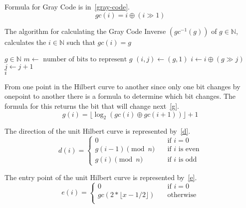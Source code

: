 \documentclass[10pt]{article}
\begin{document}
\flushleft
Formula for Gray Code is in~\ref{gray-code}.
\begin{equation}
  \label{gray-code}
  gc(i) = i \oplus \left( i \gg 1 \right) 
\end{equation}

\begin{algorithm}
  \caption{The algorithm for calculating the Gray Code Inverse $(gc^{-1}(g))$ of $g \in \mathbb{N}$, calculates the $i \in \mathbb{N}$ such that $gc\left( i \right) = g $ }
  \label{gray-code-inverse}
  \begin{algorithmic}[1]
    \Require $g \in \mathbb{N}$ 
    \State $ m \leftarrow \text{ number of bits to represent } g$ 
    \State $ \left( i, j \right) \leftarrow \left( g, 1 \right) $ 
    \State $ i \leftarrow i \oplus \left( g \gg j \right)$ 
    \State $ j \leftarrow j + 1$ 
    \EndWhile \\
    \Return $i$ %
  \end{algorithmic}
\end{algorithm}

From one point in the Hilbert curve to another since only one bit changes by onepoint to another there is a formula to determine which bit changes. The formula for this returns the bit that will change next~\ref{g}.
\begin{equation}
  \label{g}
  g(i) = \lfloor \log _{2} \left( gc(i) \oplus gc(i+1) \right) \rfloor + 1
\end{equation}


The direction of the unit Hilbert curve is represented by~\ref{d}.
\begin{equation}
  \label{d}
  d(i) = 
    \begin{cases}
      0 & \quad \text{if $i = 0$}\\
      g(i - 1) \pmod{n} & \quad \text{if $i$ is even} \\
      g(i) \pmod{n} & \quad \text{if $i$ is odd}
    \end{cases}
\end{equation}

The entry point of the unit Hilbert curve is represented by~\ref{e}.
\begin{equation}
  \label{e}
  e(i) =  
    \begin{cases}
      0 & \quad \text{if $i = 0$}\\
      gc(2 * \lfloor x-1/2 \rfloor) & \quad \text{otherwise} \\
    \end{cases}
\end{equation}
\end{document}
